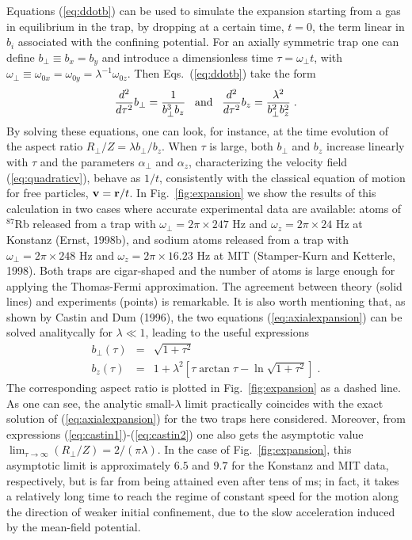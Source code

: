 Equations (\ref{eq:ddotb}) can be used to simulate the expansion
starting from a gas in equilibrium in the trap, by dropping at
a certain time, $t=0$, the term linear in $b_i$ associated with
the confining potential. For an axially symmetric trap one can 
define $b_\perp \equiv b_x = b_y$ and introduce a dimensionless 
time $\tau = \omega_\perp t$, with $\omega_\perp \equiv \omega_{0x}
=\omega_{0y} = \lambda^{-1} \omega_{0z}$. Then Eqs.~(\ref{eq:ddotb}) 
take the form
\begin{equation}
{d^2 \over d \tau^2} b_\perp = {1 \over b_\perp^3 b_z} \; \; \;
{\rm and}  \; \; \;  
{d^2 \over d \tau^2} b_z = {\lambda^2 \over b_\perp^2 b_z^2} \; . 
\label{eq:axialexpansion}
\end{equation}
By solving these equations, one can look, for instance, at the time 
evolution of the aspect ratio $R_\perp / Z  = \lambda b_\perp/b_z$. 
When $\tau$ is large, both $b_\perp$ and $b_z$ increase linearly 
with $\tau$ and the parameters $\alpha_\perp$ and $\alpha_z$,
characterizing the velocity field (\ref{eq:quadraticv}), behave 
as $1/t$, consistently with the classical equation of motion for 
free particles, ${\bf v}={\bf r}/t$.  In  
Fig.~\ref{fig:expansion} we show the results of this calculation in 
two cases where accurate experimental data are available: atoms of 
$^{87}$Rb released from a trap with $\omega_\perp = 2\pi \times 247$ Hz 
and $\omega_z=2\pi \times 24$ Hz at Konstanz (Ernst, 1998b), and 
sodium atoms released from a trap with $\omega_\perp = 2\pi \times 248$ Hz 
and $\omega_z=2\pi \times 16.23$ Hz at MIT (Stamper-Kurn and 
Ketterle, 1998). Both traps are cigar-shaped and the number of atoms 
is large enough for applying the Thomas-Fermi approximation. The
agreement between theory (solid lines) and experiments (points)
is remarkable.  It is also worth mentioning that, as shown by Castin 
and Dum (1996), the two equations (\ref{eq:axialexpansion}) can be 
solved analitycally for $\lambda \ll 1$, leading to the useful expressions
\begin{eqnarray}
b_\perp (\tau) & = & \sqrt{1+\tau^2} 
\label{eq:castin1} \\
b_z (\tau)     & = & 1+ \lambda^2 [ \tau \arctan \tau - 
\ln \sqrt{ 1+\tau^2 }  ] \; . 
\label{eq:castin2}
\end{eqnarray}
The corresponding aspect ratio is plotted in Fig.~\ref{fig:expansion} 
as a dashed line. As one can see, the analytic small-$\lambda$ limit 
practically coincides with the exact solution of (\ref{eq:axialexpansion})
for the two traps here considered.  Moreover, from expressions
(\ref{eq:castin1})-(\ref{eq:castin2}) one also gets the asymptotic
value $\lim_{\tau \to \infty} (R_\perp / Z)  = 2/(\pi \lambda)$. 
In the case of Fig.~\ref{fig:expansion}, this asymptotic limit 
is approximately $6.5$ and $9.7$ for the Konstanz and MIT data, 
respectively, but is far from being attained even after tens of ms; in fact,
it takes a relatively long time to reach the regime of constant speed
for the motion along the direction of weaker initial confinement, due
to the slow acceleration induced by the mean-field potential.  

